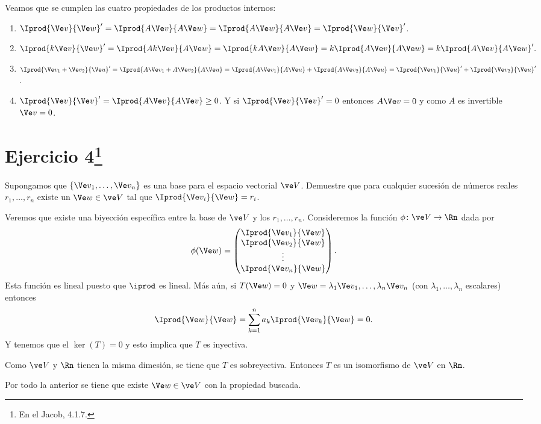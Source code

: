 \begin{sol}
	Veamos que se cumplen las cuatro propiedades de los productos internos:
	\begin{enumerate}
		\item $\Iprod{\Ve v}{\Ve w}' = \Iprod{A\Ve v}{A\Ve w} = \Iprod{A\Ve w}{A\Ve v} = \Iprod{\Ve w}{\Ve v}'$.
		\item $\Iprod{k\Ve v}{\Ve w}' = \Iprod{Ak\Ve v}{A\Ve w} = \Iprod{kA\Ve v}{A\Ve w} = k\Iprod{A\Ve v}{A\Ve w} = k\Iprod{A\Ve v}{A\Ve w}'.$
		\item $\Iprod{\Ve v_1+\Ve v_2}{\Ve u}' = \Iprod{A\Ve v_1+A\Ve v_2}{A\Ve u} = \Iprod{A\Ve v_1}{A\Ve u} + \Iprod{A\Ve v_2}{A\Ve u} = \Iprod{\Ve v_1}{\Ve u}' + \Iprod{\Ve v_2}{\Ve u}'$.
		\item $\Iprod{\Ve v}{\Ve v}' = \Iprod{A\Ve v}{A\Ve v}\geq 0$. Y si $\Iprod{\Ve v}{\Ve v}' = 0$ entonces $A\Ve v=0$ y como $A$ es invertible $\Ve v=0$.
	\end{enumerate}
\end{sol}
\section*{Ejercicio 4\footnote{En el Jacob, 4.1.7.}}

Supongamos que $\{\Ve v_1,\dots,\Ve v_n\}$ es una base para el espacio vectorial $\ve V$. Demuestre que para cualquier sucesión de números reales $r_1,\dots,r_n$ existe un $\Ve w\in\ve V$ tal que $\Iprod{\Ve v_i}{\Ve w} = r_i$.

\begin{sol}
	Veremos que existe una biyección específica entre la base de $\ve V$ y los $r_1,\dots,r_n$. Consideremos la función $\phi\colon\ve V\to\Rn$ dada por
	\[ \phi(\Ve w) = \begin{pmatrix}
	\Iprod{\Ve v_1}{\Ve w} \\
	\Iprod{\Ve v_2}{\Ve w} \\
	\vdots \\
	\Iprod{\Ve v_n}{\Ve w} \\
	\end{pmatrix}. \]
	Esta función es lineal puesto que $\iprod$ es lineal. Más aún, si $T(\Ve w) = 0$ y $\Ve w=\lambda_1\Ve v_1,\dots,\lambda_n\Ve v_n$ (con $\lambda_1,\dots,\lambda_n$ escalares) entonces
	\[ \Iprod{\Ve w}{\Ve w} = \sum_{k=1}^{n} a_k\Iprod{\Ve v_k}{\Ve w} = 0. \]
	Y tenemos que el $\ker(T) = 0$ y esto implica que $T$ es inyectiva.
	
	Como $\ve V$ y $\Rn$ tienen la misma dimesión, se tiene que $T$ es sobreyectiva. Entonces $T$ es un isomorfismo de $\ve V$ en $\Rn$.
	
	Por todo la anterior se tiene que existe $\Ve w\in\ve V$ con la propiedad buscada.
\end{sol}

